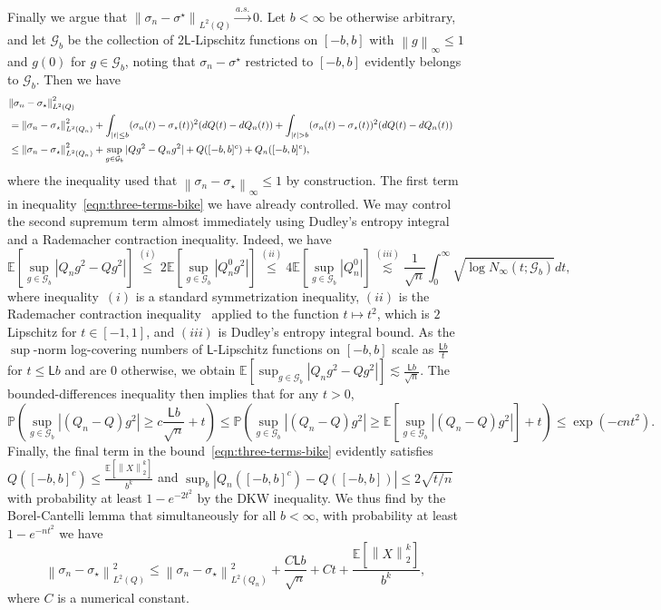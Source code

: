 \documentclass[11pt]{article}
\newcommand{\E}{\mathbb{E}}
\renewcommand{\P}{\mathbb{P}}
\newcommand{\mc}[1]{\mathcal{#1}}
\newcommand{\norm}[1]{\left\|{#1}\right\|} %
\newcommand{\lipconst}{\mathsf{L}}
\newcommand{\ltwo}[1]{\norm{#1}_2} %
\newcommand{\linf}[1]{\norm{#1}_\infty} %
\newcommand{\<}{\langle} %
\renewcommand{\>}{\rangle}
\newcommand{\cas}{\stackrel{a.s.}{\rightarrow}}
\newcommand{\LtwoQ}[1]{\norm{#1}_{L^2(Q)}}
\newcommand{\LtwoQn}[1]{\norm{#1}_{L^2(Q_n)}}
\newcommand{\opt}{^\star}
\newcommand{\subopt}{_\star}
\begin{document}
Finally we argue that $\LtwoQ{\sigma_n - \sigma\opt} \cas 0$.
Let $b < \infty$ be otherwise arbitrary, and let
$\mc{G}_b$ be the collection of $2\lipconst$-Lipschitz functions on
$[-b, b]$ with $\linf{g} \le 1$ and $g(0)$ for $g \in \mc{G}_b$, noting
that $\sigma_n - \sigma\opt$ restricted to $[-b, b]$ evidently
belongs to $\mc{G}_b$. Then we have
\begin{align}
  \lefteqn{\LtwoQ{\sigma_n - \sigma\subopt}^2} \nonumber \\
  & = \LtwoQn{\sigma_n - \sigma\subopt}^2
  + \int_{|t| \le b} (\sigma_n(t) - \sigma\subopt(t))^2
  (dQ(t) - dQ_n(t))
  + \int_{|t| > b} (\sigma_n(t) - \sigma\subopt(t))^2 
  (dQ(t) - dQ_n(t)) \nonumber \\
  & \le \LtwoQn{\sigma_n - \sigma\subopt}^2
  + \sup_{g \in \mc{G}_b} |Q g^2 - Q_n g^2|
  + Q([-b, b]^c) + Q_n([-b, b]^c),
  \label{eqn:three-terms-bike}
\end{align}
where the inequality used that $\linf{\sigma_n - \sigma\subopt} \le 1$
by construction.
The first term in inequality~\eqref{eqn:three-terms-bike} we have
already controlled. We may control the second supremum term
almost immediately using Dudley's entropy integral
and a Rademacher contraction inequality.
Indeed, we have
\begin{equation*}
  \E[\sup_{g \in \mc{G}_b} |Q_n g^2 - Q g^2|]
  \stackrel{(i)}{\le} 2 \E[\sup_{g \in \mc{G}_b} |Q_n^0 g^2|]
  \stackrel{(ii)}{\le} 4 \E[\sup_{g \in \mc{G}_b} |Q_n^0|]
  \stackrel{(iii)}{\lesssim} \frac{1}{\sqrt{n}} \int_0^\infty
  \sqrt{\log N_\infty(t; \mc{G}_b)} dt,
\end{equation*}
where inequality~$(i)$ is a standard symmetrization inequality, $(ii)$ is
the Rademacher contraction inequality~\cite[Ch.~4]{LedouxTa91} applied to
the function $t \mapsto t^2$, which is $2$ Lipschitz for $t \in [-1, 1]$,
and $(iii)$ is Dudley's entropy integral bound. As the $\sup$-norm
log-covering numbers of $\lipconst$-Lipschitz functions on $[-b, b]$ scale
as $\frac{\lipconst b}{t}$ for $t \le \lipconst b$ and are 0 otherwise, we
obtain $\E[\sup_{g \in \mc{G}_b} |Q_n g^2 - Q g^2|] \lesssim
\frac{\lipconst b}{\sqrt{n}}$.  The bounded-differences inequality then implies that
for any $t > 0$,
\begin{equation*}
  \P\left(\sup_{g \in \mc{G}_b} |(Q_n - Q)g^2|
  \ge c \frac{\lipconst b}{\sqrt{n}} + t \right) \le
  \P\left(\sup_{g \in \mc{G}_b} |(Q_n - Q) g^2|
  \ge \E[\sup_{g \in \mc{G}_b} |(Q_n - Q) g^2|] + t \right)
  \le \exp(-c n t^2).
\end{equation*}
Finally, the final term in the bound~\eqref{eqn:three-terms-bike}
evidently satisfies $Q([-b, b]^c) \le \frac{\E[\ltwo{X}^k]}{b^k}$
and $\sup_b |Q_n([-b,b]^c) - Q([-b, b])| \le 2 \sqrt{t / n}$
with probability at least $1 - e^{-2t^2}$ by the DKW inequality.
We thus find by the Borel-Cantelli lemma that simultaneously
for all $b < \infty$, with probability at least
$1 - e^{-nt^2}$ we have
\begin{equation*}
  \LtwoQ{\sigma_n - \sigma\subopt}^2 \le
  \LtwoQn{\sigma_n - \sigma\subopt}^2
  + \frac{C \lipconst b}{\sqrt{n}} + C t + \frac{\E[\ltwo{X}^k]}{b^k},
\end{equation*}
where $C$ is a numerical constant.
\end{document}
